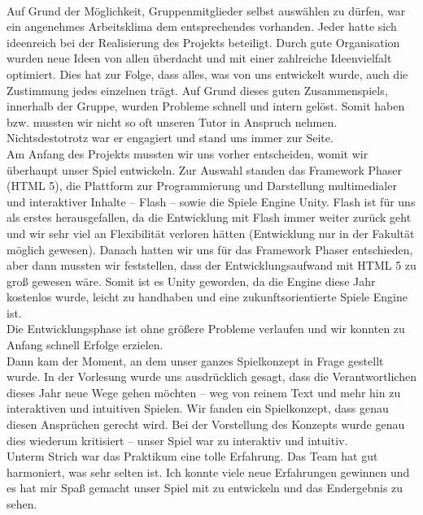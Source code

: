 \documentclass[10pt,a4paper,notitlepage]{report}
\begin{document}
	\\\par\medskip\Text
	Auf Grund der Möglichkeit, Gruppenmitglieder selbst auswählen zu dürfen, war ein angenehmes Arbeitsklima dem entsprechendes vorhanden. Jeder hatte sich ideenreich bei der Realisierung des Projekts beteiligt. Durch gute Organisation wurden neue Ideen von allen überdacht und mit einer zahlreiche Ideenvielfalt optimiert. Dies hat zur Folge, dass alles, was von uns entwickelt wurde, auch die Zustimmung jedes einzelnen trägt. Auf Grund dieses guten Zusammenspiels, innerhalb der Gruppe, wurden Probleme schnell und intern gelöst. Somit haben bzw. mussten wir nicht so oft unseren Tutor in Anspruch nehmen. Nichtsdestotrotz war er engagiert und stand uns immer zur Seite.\\
	Am Anfang des Projekts mussten wir uns vorher entscheiden, womit wir überhaupt unser Spiel entwickeln. Zur Auswahl standen das Framework Phaser (HTML 5), die Plattform zur Programmierung und Darstellung multimedialer und interaktiver Inhalte – Flash – sowie die Spiele Engine Unity. Flash ist für uns als erstes herausgefallen, da die Entwicklung mit Flash immer weiter zurück geht und wir sehr viel an Flexibilität verloren hätten (Entwicklung nur in der Fakultät möglich gewesen). Danach hatten wir uns für das Framework Phaser entschieden, aber dann mussten wir feststellen, dass der Entwicklungsaufwand mit HTML 5 zu groß gewesen wäre. Somit ist es Unity geworden, da die Engine diese Jahr kostenlos wurde, leicht zu handhaben und eine zukunftsorientierte Spiele Engine ist.\\ 
	Die Entwicklungsphase ist ohne größere Probleme verlaufen und wir konnten zu Anfang schnell Erfolge erzielen.\\ 
	Dann kam der Moment, an dem unser ganzes Spielkonzept in Frage gestellt wurde. In der Vorlesung wurde uns ausdrücklich gesagt, dass die Verantwortlichen dieses Jahr neue Wege gehen möchten – weg von reinem Text und mehr hin zu interaktiven und intuitiven Spielen. Wir fanden ein Spielkonzept, dass genau diesen Ansprüchen gerecht wird. Bei der Vorstellung des Konzepts wurde genau dies wiederum kritisiert – unser Spiel war zu interaktiv und intuitiv.\\
	Unterm Strich war das Praktikum eine tolle Erfahrung. Das Team hat gut harmoniert, was sehr selten ist. Ich konnte viele neue Erfahrungen gewinnen und es hat mir Spaß gemacht unser Spiel mit zu entwickeln und das Endergebnis zu sehen.\\\par\smallskip
\end{document}
